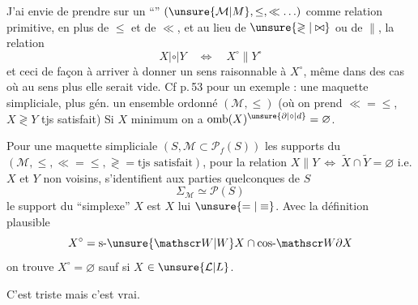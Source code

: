 J'ai envie de prendre sur un ``'' $(\unsure{\mathcal M|M},\leq,\ll\ldots)$ comme relation primitive, en plus de $\leq$ et de $\ll$, et au lieu de $\unsure{\gtrless|\bowtie}$ ou de $\parallel$, la  relation
\[
X\mathrel{|\circ|}Y\quad\Longleftrightarrow\quad X^{\circ}\parallel Y^{\circ}
\]
et ceci de façon à arriver à donner un sens raisonnable à $X^{\circ}$, même dans des cas où au sens plus   elle serait vide.  Cf p.\,53 pour un exemple :  une maquette simpliciale, plus gén. un ensemble ordonné $(\mathcal M,\leq)$ (où on prend $\ll=\leq$, $X\gtrless Y$ tjs satisfait)  Si $X$  minimum on a $\operatorname{omb}(X)^{\unsure{\partial|\circ|d}}=\varnothing$.

Pour une maquette simpliciale $(S,\mathcal M\subset\mathscr P_f(S))$ les supports du $(\mathcal M,\leq,\ll=\leq,\gtrless=\text{tjs satisfait})$, pour la relation $X\parallel Y\ \Longleftrightarrow\ \widetilde X\cap\widetilde Y=\varnothing$ i.e. $X$ et $Y$ non voisins, s'identifient aux parties quelconques de $S$
\[
\Sigma_{\mathcal M}\simeq\mathscr P(S)
\]
le support du  ``simplexe'' $X$ est $X$ lui $\unsure{=|\equiv}$. Avec la définition plausible
\[
X^{\circ}=\mathrm{s}\text{-}\unsure{\mathscr W|W}X\cap\mathrm{cos}\text{-}\mathscr W\partial X
\]
on trouve $X^{\circ}=\varnothing$ sauf si $X$  $\in\unsure{\mathcal L|L}$.

C'est triste mais c'est vrai.
